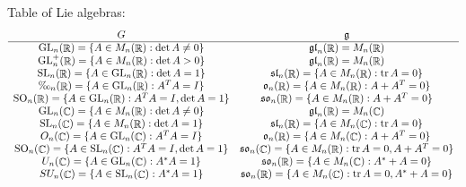 \documentclass[11pt, a4paper]{memoir}
\DeclareMathOperator{\R}{{\mathbb{R}}}
\DeclareMathOperator{\C}{{\mathbb{C}}}
\theoremstyle{change}
\theoremstyle{plain}
\theoremstyle{nonumberplain}
\DeclareMathOperator{\GL}{GL}
\DeclareMathOperator{\SL}{SL}
\DeclareMathOperator{\SO}{SO}
\DeclareMathOperator{\tr}{tr}
\numberwithin{equation}{section}
\begin{document}
Table of Lie algebras:
\begin{equation*}
    \begin{array}{cc}
        G & \mathfrak{g}\\
        \hline
        \GL_n(\R)=\{A\in M_n(\R):\det A\neq 0\}&\mathfrak{gl}_n(\R)=M_n(\R)\\
        \GL_n^+(\R)=\{A\in M_n(\R):\det A>0\}&\mathfrak{gl}_n(\R)=M_n(\R)\\
        \SL_n(\R)=\{A\in \GL_n(\R):\det A=1\}&\mathfrak{sl}_n(\R)=\{A\in M_n(\R):\tr A=0\}\\
        \O_n(\R)=\{A\in \GL_n(\R):A^TA=I\}&\mathfrak{o}_n(\R)=\{A\in M_n(\R):A+A^T=0\}\\
        \SO_n(\R)=\{A\in \GL_n(\R):A^TA=I,\det A=1\} & \mathfrak{so}_n(\R)=\{A\in M_n(\R):A+A^T=0\}\\
        \GL_n(\C)=\{A\in M_n(\R):\det A\neq 0\}&\mathfrak{gl}_n(\R)=M_n(\C)\\
        \SL_n(\C)=\{A\in M_n(\R):\det A=1\}&\mathfrak{sl}_n(\R)=\{A\in M_n(\C):\tr A=0\}\\
        O_n(\C)=\{A\in \GL_n(\C):A^TA=I\}&\mathfrak{o}_n(\R)=\{A\in M_n(\C):A+A^T=0\}\\
        \SO_n(\C)=\{A\in \SL_n(\C):A^TA=I,\det A=1\} & \mathfrak{so}_n(\C)=\{A\in M_n(\R):\tr A=0,A+A^T=0\}\\
        U_n(\C)=\{A\in \GL_n(\C):A^*A=1\} & \mathfrak{so}_n(\R)=\{A\in M_n(\C):A^*+A=0\}\\
        SU_n(\C)=\{A\in \SL_n(\C):A^*A=1\} & \mathfrak{so}_n(\R)=\{A\in M_n(\C):\tr A=0,A^*+A=0\}
    \end{array}
\end{equation*}
\end{document}
